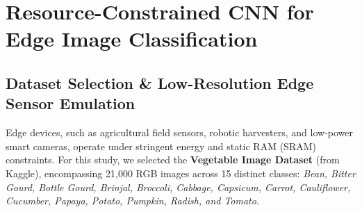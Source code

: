 
\tableofcontents
\thispagestyle{fancy}
\clearpage

{}

\begin{abstract}
Deploying deep convolutional neural networks (CNNs) on resource-constrained edge hardware (e.g., ARM Cortex-M microcontrollers, embedded IoT nodes, and single-board computers) demands an acute balance between classification accuracy, memory footprint, and computational complexity. In this assignment, we investigate edge-oriented image classification across 15 vegetable categories downscaled to $64 \times 64$ pixels. We design, implement, and benchmark two custom architectures from scratch: \textbf{Model A} (Standard CNN, 259,631 trainable parameters) and \textbf{Model B} (Depthwise Separable CNN, 40,175 trainable parameters, adhering strictly to a sub-100k budget). Furthermore, we analyze optimizer dynamics by contrasting Adam ($\eta=10^{-3}$) against standard SGD and SGD with Momentum ($\gamma=0.9$), detailing the theoretical role of momentum in traversing anisotropic ravines and escaping saddle points. Finally, we fine-tune two mobile state-of-the-art architectures (\textbf{MobileNetV2} and \textbf{EfficientNet-B0}) under identical data splits. Our empirical findings demonstrate that Model B achieves \textbf{97.70\% test accuracy}—outperforming Model A (\textbf{97.57\%}) while reducing parameters by \textbf{84.5\%}, disk footprint by \textbf{80.0\%}, and training time per epoch by \textbf{47.4\%}. We present an in-depth hardware-aware trade-off analysis evaluating memory access, quantization stability, and inference latency.
\end{abstract}

\clearpage

\section{Resource-Constrained CNN for Edge Image Classification}

\subsection{Dataset Selection \& Low-Resolution Edge Sensor Emulation}

Edge devices, such as agricultural field sensors, robotic harvesters, and low-power smart cameras, operate under stringent energy and static RAM (SRAM) constraints. For this study, we selected the \textbf{Vegetable Image Dataset} (from Kaggle), encompassing 21,000 RGB images across 15 distinct classes: \textit{Bean, Bitter Gourd, Bottle Gourd, Brinjal, Broccoli, Cabbage, Capsicum, Carrot, Cauliflower, Cucumber, Papaya, Potato, Pumpkin, Radish, and Tomato}.

